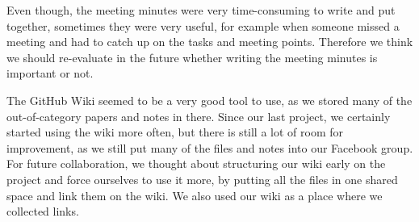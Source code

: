 Even though, the meeting minutes were very time-consuming to write and put together, sometimes they were very useful, for example when someone missed a meeting and had to catch up on the tasks and meeting points. Therefore we think we should re-evaluate in the future whether writing the meeting minutes is important or not.

The GitHub Wiki seemed to be a very good tool to use, as we stored many of the out-of-category papers and notes in there. Since our last project, we certainly started using the wiki more often, but there is still a lot of room for improvement, as we still put many of the files and notes into our Facebook group. For future collaboration, we thought about structuring our wiki early on the project and force ourselves to use it more, by putting all the files in one shared space and link them on the wiki. We also used our wiki as a place where we collected links.
